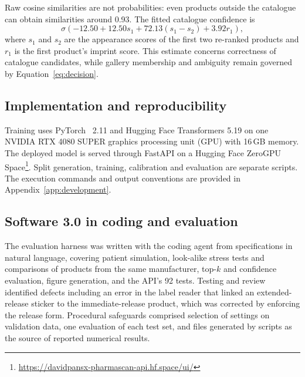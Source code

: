 Raw cosine similarities are not probabilities: even products outside the catalogue can obtain similarities around 0.93. The fitted catalogue confidence is
\begin{equation}
  \sigma\!\left(-12.50+12.50s_1+72.13(s_1-s_2)+3.92r_1\right),
\end{equation}
where $s_1$ and $s_2$ are the appearance scores of the first two re-ranked products and $r_1$ is the first product's imprint score. This estimate concerns correctness of catalogue candidates, while gallery membership and ambiguity remain governed by Equation~\ref{eq:decision}.

\subsection{Implementation and reproducibility}
Training uses PyTorch~\citep{paszke2019pytorch} 2.11 and Hugging Face Transformers 5.19 on one NVIDIA RTX 4080 SUPER graphics processing unit (GPU) with 16\,GB memory. The deployed model is served through FastAPI on a Hugging Face ZeroGPU Space\footnote{\url{https://davidpansx-pharmascan-api.hf.space/ui/}}. Split generation, training, calibration and evaluation are separate scripts. The execution commands and output conventions are provided in Appendix~\ref{app:development}.

\subsection{Software 3.0 in coding and evaluation}
\label{sec:sw3-approach}\label{sec:sw3-experiments}
The evaluation harness was written with the coding agent from specifications in natural language, covering patient simulation, look-alike stress tests and comparisons of products from the same manufacturer, top-$k$ and confidence evaluation, figure generation, and the API's 92 tests. Testing and review identified defects including an error in the label reader that linked an extended-release sticker to the immediate-release product, which was corrected by enforcing the release form. Procedural safeguards comprised selection of settings on validation data, one evaluation of each test set, and files generated by scripts as the source of reported numerical results.
